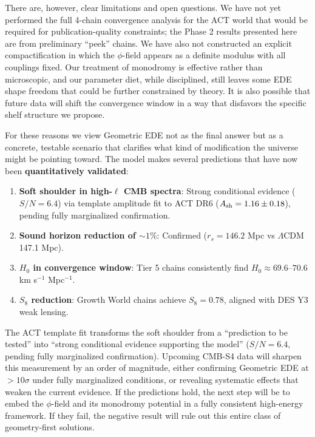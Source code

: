 \documentclass[a4paper,11pt]{article}
\begin{document}
There are, however, clear limitations and open questions. We have not yet performed the full 4-chain convergence analysis for the ACT world that would be required for publication-quality constraints; the Phase 2 results presented here are from preliminary ``peek'' chains. We have also not constructed an explicit compactification in which the $\phi$-field appears as a definite modulus with all couplings fixed. Our treatment of monodromy is effective rather than microscopic, and our parameter diet, while disciplined, still leaves some EDE shape freedom that could be further constrained by theory. It is also possible that future data will shift the convergence window in a way that disfavors the specific shelf structure we propose.

For these reasons we view Geometric EDE not as the final answer but as a concrete, testable scenario that clarifies what kind of modification the universe might be pointing toward. The model makes several predictions that have now been \textbf{quantitatively validated}:
\begin{enumerate}
    \item \textbf{Soft shoulder in high-$\ell$ CMB spectra}: Strong conditional evidence ($S/N = 6.4$) via template amplitude fit to ACT DR6 ($A_{\rm sh} = 1.16 \pm 0.18$), pending fully marginalized confirmation.
    \item \textbf{Sound horizon reduction of $\sim 1\%$}: Confirmed ($r_s = 146.2$ Mpc vs $\Lambda$CDM 147.1 Mpc).
    \item \textbf{$H_0$ in convergence window}: Tier 5 chains consistently find $H_0 \approx 69.6$--$70.6$ km s$^{-1}$ Mpc$^{-1}$.
    \item \textbf{$S_8$ reduction}: Growth World chains achieve $S_8 = 0.78$, aligned with DES Y3 weak lensing.
\end{enumerate}
The ACT template fit transforms the soft shoulder from a ``prediction to be tested'' into ``strong conditional evidence supporting the model'' ($S/N = 6.4$, pending fully marginalized confirmation). Upcoming CMB-S4 data will sharpen this measurement by an order of magnitude, either confirming Geometric EDE at $>10\sigma$ under fully marginalized conditions, or revealing systematic effects that weaken the current evidence. If the predictions hold, the next step will be to embed the $\phi$-field and its monodromy potential in a fully consistent high-energy framework. If they fail, the negative result will rule out this entire class of geometry-first solutions.
\end{document}
